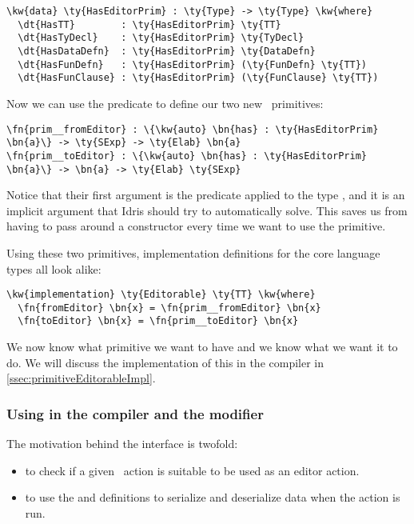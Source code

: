 \begin{Verbatim}[framesep=2mm, label=\footnotesize{\normalfont{Idris}}, labelposition=topline]
\kw{data} \ty{HasEditorPrim} : \ty{Type} -> \ty{Type} \kw{where}
  \dt{HasTT}        : \ty{HasEditorPrim} \ty{TT}
  \dt{HasTyDecl}    : \ty{HasEditorPrim} \ty{TyDecl}
  \dt{HasDataDefn}  : \ty{HasEditorPrim} \ty{DataDefn}
  \dt{HasFunDefn}   : \ty{HasEditorPrim} (\ty{FunDefn} \ty{TT})
  \dt{HasFunClause} : \ty{HasEditorPrim} (\ty{FunClause} \ty{TT})
\end{Verbatim}

Now we can use the predicate  to define our two new
\Elab\ primitives:

\begin{Verbatim}[framesep=2mm, label=\footnotesize{\normalfont{Idris}}, labelposition=topline]
\fn{prim__fromEditor} : \{\kw{auto} \bn{has} : \ty{HasEditorPrim} \bn{a}\} -> \ty{SExp} -> \ty{Elab} \bn{a}
\fn{prim__toEditor} : \{\kw{auto} \bn{has} : \ty{HasEditorPrim} \bn{a}\} -> \bn{a} -> \ty{Elab} \ty{SExp}
\end{Verbatim}

Notice that their first argument is the predicate  applied to
the type , and it is an implicit argument that Idris should try to
automatically solve. This saves us from having to pass around a constructor
every time we want to use the primitive.

Using these two primitives,  implementation definitions for the
core language types all look alike:

\begin{Verbatim}[framesep=2mm, label=\footnotesize{\normalfont{Idris}}, labelposition=topline]
\kw{implementation} \ty{Editorable} \ty{TT} \kw{where}
  \fn{fromEditor} \bn{x} = \fn{prim__fromEditor} \bn{x}
  \fn{toEditor} \bn{x} = \fn{prim__toEditor} \bn{x}
\end{Verbatim}

We now know what primitive we want to have and we know what we want it to do.
We will discuss the implementation of this in the compiler in
\autoref{ssec:primitiveEditorableImpl}.

\subsubsection{Using  in the compiler and the  modifier}\label{sssec:usingEditorable}

The motivation behind the  interface is twofold:
\begin{itemize}
\item to check if a given \Elab\ action is suitable to be used as an editor
  action.
\item to use the  and  definitions to serialize
  and deserialize data when the action is run.
\end{itemize}

